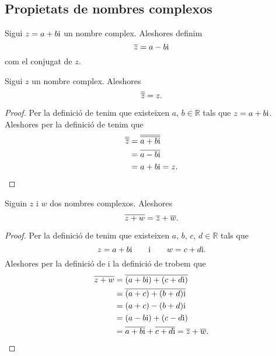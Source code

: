 \documentclass[../Apunts.tex]{subfiles}
\begin{document}
	\subsection{Propietats de nombres complexos}
	\begin{definition}
		\label{def:conjugat d'un nombre complex}
		Sigui \(z=a+b\mathrm{i}\) un nombre complex. Aleshores definim
		\[\overline{z}=a-b\mathrm{i}\]
		com el conjugat de \(z\).
	\end{definition}
	\begin{proposition}
		\label{prop:el conjugat del conjugat d'un nombre complex és ell mateix}
		Sigui \(z\) un nombre complex. Aleshores
		\[\overline{\overline{z}}=z.\]
		\begin{proof}
			Per la definició de  tenim que existeixen \(a\), \(b\in\mathbb{R}\) tals que \(z=a+b\mathrm{i}\). Aleshores per la definició de  tenim que
			\begin{align*}
				\overline{\overline{z}}&=\overline{\overline{a+b\mathrm{i}}} \\
				&=\overline{a-b\mathrm{i}} \\
				&=a+b\mathrm{i}=z.\qedhere
			\end{align*}
		\end{proof}
	\end{proposition}
	\begin{proposition}
		\label{prop:el conjugat de la suma és la suma de conjugats}
		Siguin \(z\) i \(w\) dos nombres complexos. Aleshores
		\[\overline{z+w}=\overline{z}+\overline{w}.\]
		\begin{proof}
			Per la definició de  tenim que existeixen \(a\), \(b\), \(c\), \(d\in\mathbb{R}\) tals que
			\[z=a+b\mathrm{i}\qquad\text{i}\qquad w=c+d\mathrm{i}.\]
			Aleshores per la definició de  i la definició de  trobem que
			\begin{align*}
				\overline{z+w}&=\overline{(a+b\mathrm{i})+(c+d\mathrm{i})} \\
				&=\overline{(a+c)+(b+d)\mathrm{i}} \\
				&=(a+c)-(b+d)\mathrm{i} \\
				&=(a-b\mathrm{i})+(c-d\mathrm{i}) \\
				&=\overline{a+b\mathrm{i}}+\overline{c+d\mathrm{i}}=\overline{z}+\overline{w}.\qedhere
			\end{align*}
		\end{proof}
	\end{proposition}
\end{document}
